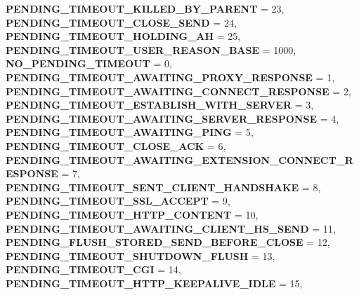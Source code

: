 \begin{DoxyCompactItemize}
{\bfseries P\+E\+N\+D\+I\+N\+G\+\_\+\+T\+I\+M\+E\+O\+U\+T\+\_\+\+K\+I\+L\+L\+E\+D\+\_\+\+B\+Y\+\_\+\+P\+A\+R\+E\+NT} = 23, 
{\bfseries P\+E\+N\+D\+I\+N\+G\+\_\+\+T\+I\+M\+E\+O\+U\+T\+\_\+\+C\+L\+O\+S\+E\+\_\+\+S\+E\+ND} = 24, 
{\bfseries P\+E\+N\+D\+I\+N\+G\+\_\+\+T\+I\+M\+E\+O\+U\+T\+\_\+\+H\+O\+L\+D\+I\+N\+G\+\_\+\+AH} = 25, 
\newline
{\bfseries P\+E\+N\+D\+I\+N\+G\+\_\+\+T\+I\+M\+E\+O\+U\+T\+\_\+\+U\+S\+E\+R\+\_\+\+R\+E\+A\+S\+O\+N\+\_\+\+B\+A\+SE} = 1000, 
{\bfseries N\+O\+\_\+\+P\+E\+N\+D\+I\+N\+G\+\_\+\+T\+I\+M\+E\+O\+UT} = 0, 
{\bfseries P\+E\+N\+D\+I\+N\+G\+\_\+\+T\+I\+M\+E\+O\+U\+T\+\_\+\+A\+W\+A\+I\+T\+I\+N\+G\+\_\+\+P\+R\+O\+X\+Y\+\_\+\+R\+E\+S\+P\+O\+N\+SE} = 1, 
{\bfseries P\+E\+N\+D\+I\+N\+G\+\_\+\+T\+I\+M\+E\+O\+U\+T\+\_\+\+A\+W\+A\+I\+T\+I\+N\+G\+\_\+\+C\+O\+N\+N\+E\+C\+T\+\_\+\+R\+E\+S\+P\+O\+N\+SE} = 2, 
\newline
{\bfseries P\+E\+N\+D\+I\+N\+G\+\_\+\+T\+I\+M\+E\+O\+U\+T\+\_\+\+E\+S\+T\+A\+B\+L\+I\+S\+H\+\_\+\+W\+I\+T\+H\+\_\+\+S\+E\+R\+V\+ER} = 3, 
{\bfseries P\+E\+N\+D\+I\+N\+G\+\_\+\+T\+I\+M\+E\+O\+U\+T\+\_\+\+A\+W\+A\+I\+T\+I\+N\+G\+\_\+\+S\+E\+R\+V\+E\+R\+\_\+\+R\+E\+S\+P\+O\+N\+SE} = 4, 
{\bfseries P\+E\+N\+D\+I\+N\+G\+\_\+\+T\+I\+M\+E\+O\+U\+T\+\_\+\+A\+W\+A\+I\+T\+I\+N\+G\+\_\+\+P\+I\+NG} = 5, 
{\bfseries P\+E\+N\+D\+I\+N\+G\+\_\+\+T\+I\+M\+E\+O\+U\+T\+\_\+\+C\+L\+O\+S\+E\+\_\+\+A\+CK} = 6, 
\newline
{\bfseries P\+E\+N\+D\+I\+N\+G\+\_\+\+T\+I\+M\+E\+O\+U\+T\+\_\+\+A\+W\+A\+I\+T\+I\+N\+G\+\_\+\+E\+X\+T\+E\+N\+S\+I\+O\+N\+\_\+\+C\+O\+N\+N\+E\+C\+T\+\_\+\+R\+E\+S\+P\+O\+N\+SE} = 7, 
{\bfseries P\+E\+N\+D\+I\+N\+G\+\_\+\+T\+I\+M\+E\+O\+U\+T\+\_\+\+S\+E\+N\+T\+\_\+\+C\+L\+I\+E\+N\+T\+\_\+\+H\+A\+N\+D\+S\+H\+A\+KE} = 8, 
{\bfseries P\+E\+N\+D\+I\+N\+G\+\_\+\+T\+I\+M\+E\+O\+U\+T\+\_\+\+S\+S\+L\+\_\+\+A\+C\+C\+E\+PT} = 9, 
{\bfseries P\+E\+N\+D\+I\+N\+G\+\_\+\+T\+I\+M\+E\+O\+U\+T\+\_\+\+H\+T\+T\+P\+\_\+\+C\+O\+N\+T\+E\+NT} = 10, 
\newline
{\bfseries P\+E\+N\+D\+I\+N\+G\+\_\+\+T\+I\+M\+E\+O\+U\+T\+\_\+\+A\+W\+A\+I\+T\+I\+N\+G\+\_\+\+C\+L\+I\+E\+N\+T\+\_\+\+H\+S\+\_\+\+S\+E\+ND} = 11, 
{\bfseries P\+E\+N\+D\+I\+N\+G\+\_\+\+F\+L\+U\+S\+H\+\_\+\+S\+T\+O\+R\+E\+D\+\_\+\+S\+E\+N\+D\+\_\+\+B\+E\+F\+O\+R\+E\+\_\+\+C\+L\+O\+SE} = 12, 
{\bfseries P\+E\+N\+D\+I\+N\+G\+\_\+\+T\+I\+M\+E\+O\+U\+T\+\_\+\+S\+H\+U\+T\+D\+O\+W\+N\+\_\+\+F\+L\+U\+SH} = 13, 
{\bfseries P\+E\+N\+D\+I\+N\+G\+\_\+\+T\+I\+M\+E\+O\+U\+T\+\_\+\+C\+GI} = 14, 
\newline
{\bfseries P\+E\+N\+D\+I\+N\+G\+\_\+\+T\+I\+M\+E\+O\+U\+T\+\_\+\+H\+T\+T\+P\+\_\+\+K\+E\+E\+P\+A\+L\+I\+V\+E\+\_\+\+I\+D\+LE} = 15, 

\end{DoxyCompactItemize}
